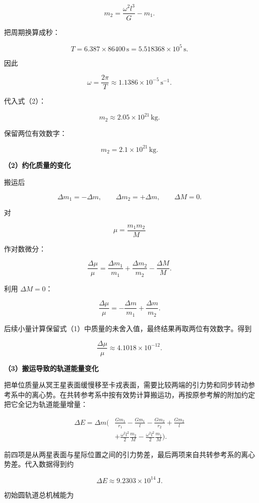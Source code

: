\documentclass[12pt,a4paper,UTF8]{ctexart}
\begin{document}
\[
\boxed{m_2=\frac{\omega^2l^3}{G}-m_1}.
\tag{2}
\]

把周期换算成秒：

\[
T=6.387\times86400\,\mathrm s
=5.518368\times10^5\,\mathrm s.
\]

因此

\[
\omega=\frac{2\pi}{T}
\approx1.1386\times10^{-5}\,\mathrm{s^{-1}}.
\]

代入式（2）：

\[
m_2\approx2.05\times10^{21}\,\mathrm{kg}.
\]

保留两位有效数字：

\[
\boxed{m_2=2.1\times10^{21}\,\mathrm{kg}}.
\tag{3}
\]

\textbf{（2）约化质量的变化}

搬运后

\[
\Delta m_1=-\Delta m,
\qquad
\Delta m_2=+\Delta m,
\qquad
\Delta M=0.
\]

对

\[
\mu=\frac{m_1m_2}{M}
\]

作对数微分：

\[
\frac{\Delta\mu}{\mu}
=\frac{\Delta m_1}{m_1}
+\frac{\Delta m_2}{m_2}
-\frac{\Delta M}{M}.
\]

利用 \(\Delta M=0\)：

\[
\boxed{
\frac{\Delta\mu}{\mu}
=-\frac{\Delta m}{m_1}+\frac{\Delta m}{m_2}
}.
\tag{4}
\]

后续小量计算保留式（1）中质量的未舍入值，最终结果再取两位有效数字。得到

\[
\boxed{\frac{\Delta\mu}{\mu}\approx4.1018\times10^{-12}}.
\tag{5}
\]

\textbf{（3）搬运导致的轨道能量变化}

把单位质量从冥王星表面缓慢移至卡戎表面，需要比较两端的引力势和同步转动参考系中的离心势。在共转参考系中按有效势计算搬运功，再按原参考解的附加约定把它全记为轨道能量增量：

\[
\begin{aligned}
\Delta E=\Delta m\Bigg(&
\frac{Gm_1}{r_1}-\frac{Gm_1}{l}
-\frac{Gm_2}{r_2}+\frac{Gm_2}{l}\\
&+\frac{\omega^2l^2}{2}\frac{m_2}{M}
-\frac{\omega^2l^2}{2}\frac{m_1}{M}
\Bigg).
\end{aligned}
\tag{6}
\]

前四项是从两星表面与星际位置之间的引力势差，最后两项来自共转参考系的离心势差。代入数据得到约

\[
\boxed{\Delta E\approx9.2303\times10^{14}\,\mathrm J}.
\tag{7}
\]

初始圆轨道总机械能为
\end{document}
